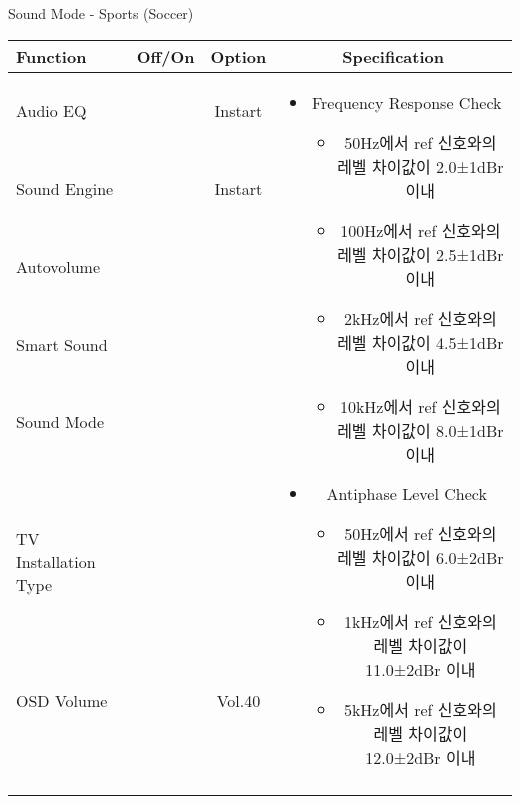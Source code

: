 \begin{frame}[t]{Sound Mode - Sports (Soccer)}
\begin{tiny}
\begin{tabular}{@{}lccc@{}}
\toprule
Function & Off/On & Option & Specification \\
\midrule
Audio EQ & \color{black}{Off} & Instart &
\multirow{10}{60mm}{
\begin{itemize}
\item Frequency Response Check
	\begin{itemize}
	\item 50Hz에서 ref 신호와의 레벨 차이값이 2.0±1dBr 이내
	\item 100Hz에서 ref 신호와의 레벨 차이값이 2.5±1dBr 이내
	\item 2kHz에서 ref 신호와의 레벨 차이값이 4.5±1dBr 이내
	\item 10kHz에서 ref 신호와의 레벨 차이값이 8.0±1dBr 이내
	\end{itemize}
\item Antiphase Level Check
	\begin{itemize}
	\item 50Hz에서 ref 신호와의 레벨 차이값이 6.0±2dBr 이내
	\item 1kHz에서 ref 신호와의 레벨 차이값이 11.0±2dBr 이내
	\item 5kHz에서 ref 신호와의 레벨 차이값이 12.0±2dBr 이내
	\end{itemize}
\end{itemize}
} \\
Sound Engine & \color{blue}{On} & Instart & \\
Autovolume & \color{black}{Off} & & \\
Smart Sound & \color{black}{Off} & & \\
Sound Mode & \color{blue}{On} & \color{blue}{Sports} & \\
TV Installation Type & \color{blue}{On} & \color{black}{Standtype1} & \\
OSD Volume & \color{blue}{On} & Vol.40 & \\
& & & \\
& & & \\
& & & \\
& & & \\
\midrule
\end{tabular}
\end{tiny}


\end{frame}
